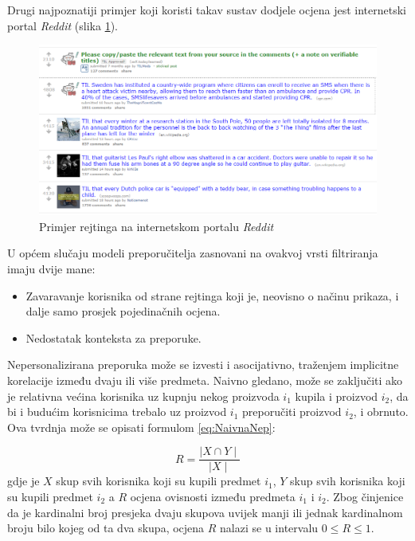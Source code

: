 \documentclass[times, utf8, diplomski, numeric]{fer}
\begin{document}
Drugi najpoznatiji primjer koji koristi takav sustav dodjele ocjena jest
internetski portal \emph{Reddit} (slika \ref{fig:reddit1}).
\begin{figure}[!htb]
	\centering
	\includegraphics[width=14.21cm]{images/neosobni/reddit1.png}
	\caption{Primjer rejtinga na internetskom portalu \emph{Reddit}}
	\label{fig:reddit1}
\end{figure}

U općem slučaju modeli preporučitelja zasnovani na ovakvoj vrsti filtriranja
imaju dvije mane:
\begin{itemize}
  \item Zavaravanje korisnika od strane rejtinga koji je, neovisno o načinu
  prikaza, i dalje samo prosjek pojedinačnih ocjena.
  \item Nedostatak konteksta za preporuke.
\end{itemize}

Nepersonalizirana preporuka može se izvesti i asocijativno, traženjem implicitne
korelacije između dvaju ili više predmeta. Naivno gledano, može se zaključiti
ako je relativna većina korisnika uz kupnju nekog proizvoda $i_1$ kupila i
proizvod $i_2$, da bi i budućim korisnicima trebalo uz proizvod $i_1$
preporučiti proizvod $i_2$, i obrnuto. Ova tvrdnja može se opisati formulom
\ref{eq:NaivnaNep}:

\begin{equation}
\label{eq:NaivnaNep}
	R = \frac{\mid X \cap Y \mid}{\mid X \mid}
\end{equation}
gdje je $X$ skup svih korisnika koji su kupili predmet $i_1$, $Y$ skup svih
korisnika koji su kupili predmet $i_2$ a $R$ ocjena ovisnosti između predmeta
$i_1$ i $i_2$. Zbog činjenice da je kardinalni broj presjeka dvaju skupova
uvijek manji ili jednak kardinalnom broju bilo kojeg od ta dva skupa, ocjena $R$
nalazi se u intervalu $0 \leq R \leq 1$.
\end{document}
